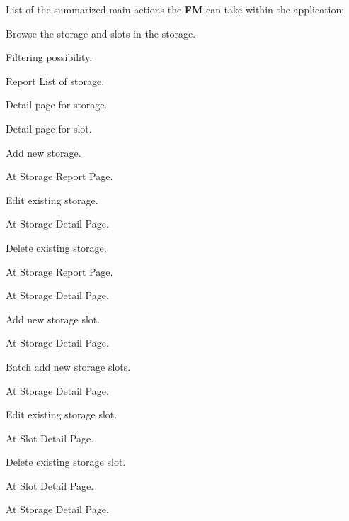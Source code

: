 \bigskip
\noindent
List of the summarized main actions the \textbf{FM} can take within the application:
\begin{compactenum}
	\item Browse the storage and slots in the storage.
        \begin{compactenum}
            \item Filtering possibility.
            \item Report List of storage.
            \item Detail page for storage.
            \item Detail page for slot.
        \end{compactenum}
    \item Add new storage.
        \begin{compactenum}
            \item At Storage Report Page.
        \end{compactenum}
    \item Edit existing storage.
        \begin{compactenum}
            \item At Storage Detail Page.
        \end{compactenum}
    \item Delete existing storage.
        \begin{compactenum}
            \item At Storage Report Page.
            \item At Storage Detail Page.
        \end{compactenum}
    \item Add new storage slot.
        \begin{compactenum}
            \item At Storage Detail Page.
        \end{compactenum}
    \item Batch add new storage slots.
        \begin{compactenum}
            \item At Storage Detail Page.
        \end{compactenum}
    \item Edit existing storage slot.
        \begin{compactenum}
            \item At Slot Detail Page.
        \end{compactenum}
    \item Delete existing storage slot.
        \begin{compactenum}
            \item At Slot Detail Page.
            \item At Storage Detail Page.
        \end{compactenum}
\end{compactenum}

